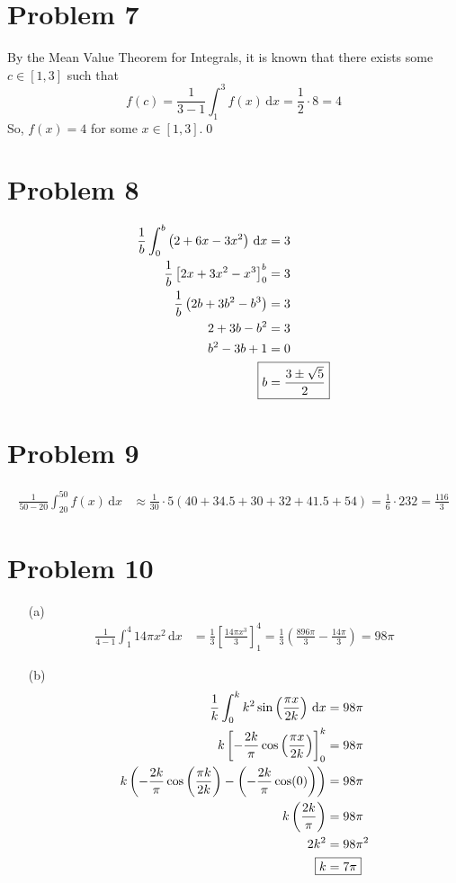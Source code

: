 \documentclass[preview, margin=0.6in]{standalone}
\newcommand*{\problem}[1]{\section*{Problem #1}}
\begin{document}
\problem{7}
By the Mean Value Theorem for Integrals, it is known that there exists some $c\in[1,3]$ such that
\begin{equation*}
    f(c)=\frac{1}{3-1}\int_{1}^{3}f(x)\,\mathrm{d}x=\frac12\cdot8=4
\end{equation*}
So, $f(x)=4$ for some $x\in[1,3]$.\qed

\problem{8}
\begin{align*}
	\frac1b \int_{0}^{b}\left(2+6x-3x^2\right)\,\mathrm{d}x&=3 \\
	\frac1b \left[2x+3x^2-x^3\right]_{0}^{b}&=3 \\ 
	\frac1b \left(2b+3b^2-b^3\right)&=3 \\ 
	2+3b-b^2&=3 \\
	b^2-3b+1&=0 \\ 
	\Aboxed{b&=\frac{3\pm \sqrt{5}}{2}}
\end{align*}

\problem{9}
\begin{align*}
    \frac{1}{50-20}\int_{20}^{50}f(x)\,\mathrm{d}x
	&\approx \frac{1}{30}\cdot5\left(40+34.5+30+32+41.5+54\right)
	=\frac16\cdot232=\boxed{\frac{116}{3}}
\end{align*}

\problem{10}
\begin{itemize}
	\item[(a)]
		\begin{align*}
		    \frac{1}{4-1}\int_{1}^{4}14\pi x^2\,\mathrm{d}x
			&=\frac13 \left[\frac{14\pi x^3}{3}\right]_{1}^{4}
			=\frac13 \left(\frac{896\pi}{3}-\frac{14\pi}{3}\right)
			=\boxed{98\pi}
		\end{align*}
	\item[(b)]
		\begin{align*}
			\frac{1}{k}\int_{0}^{k}k^2 \sin\left(\frac{\pi x}{2k}\right)\,\mathrm{d}x&=98\pi \\
			k\left[-\frac{2k}{\pi}\cos\left(\frac{\pi x}{2k}\right)\right]_0^k&=98\pi \\
			k\left(-\frac{2k}{\pi}\cos\left(\frac{\pi k}{2k}\right)-\left(-\frac{2k}{\pi}\cos(0)\right)\right)&=98\pi \\
			k\left(\frac{2k}{\pi}\right)&=98\pi \\
			2k^2&=98\pi^2 \\ 
			\Aboxed{k&=7\pi}
		\end{align*}
\end{itemize}
\end{document}
